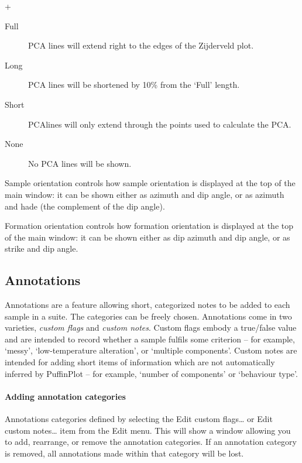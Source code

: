 \documentclass[a4paper,british]{article}
\newcommand{\menuitemlabel}[1]{%
\mbox{\textsf{#1}}\hfil}
\newenvironment{menuitemlist}%
{\begin{list}{}{%
\renewcommand{\makelabel}{\menuitemlabel}%
\setlength{\labelwidth}{35pt}%
\setlength{\leftmargin}%
             {\labelwidth+\labelsep}}}%
{\end{list}}
\newcommand{\ppcmd}[1]{\textsf{#1}} %
\newcommand{\caps}[1]{\MakeTextUppercase{#1}} %
\newcommand{\quot}[1]{`#1'}
\begin{document}
\begin{menuitemlist}
\begin{description}
\item[Full] \caps{pca} lines will extend right to the edges of the Zijderveld
  plot.
\item[Long] \caps{pca} lines will be shortened by 10\% from the `Full' length.
\item[Short] \caps{pca}lines will only extend through the points used to calculate
  the \caps{pca}.
\item[None] No \caps{pca} lines will be shown.
\end{description}

\item[Sample orientation] controls how sample orientation is displayed at the
  top of the main window: it can be shown either as azimuth and dip angle, or
  as azimuth and hade (the complement of the dip angle).

\item[Formation orientation] controls how formation orientation is displayed
  at the top of the main window: it can be shown either as dip azimuth and
  dip angle, or as strike and dip angle.

\end{menuitemlist}

\subsection{\label{sec:annotations}Annotations}

Annotations are a feature allowing short, categorized notes to be added to
each sample in a suite. The categories can be freely chosen. Annotations come
in two varieties, \emph{custom flags} and \emph{custom notes}. Custom flags
embody a true/false value and are intended to record whether a sample fulfils
some criterion -- for example, \quot{messy}, \quot{low-temperature
  alteration}, or \quot{multiple components}. Custom notes are intended for
adding short items of information which are not automatically inferred by
PuffinPlot -- for example, \quot{number of components} or \quot{behaviour
  type}.

\paragraph{Adding annotation categories}

Annotations categories defined by selecting the \ppcmd{Edit custom
  flags\ldots} or \ppcmd{Edit custom notes\ldots} item from the \ppcmd{Edit}
menu. This will show a window allowing you to add, rearrange, or remove the
annotation categories. If an annotation category is removed, all annotations
made within that category will be lost.
\end{document}
